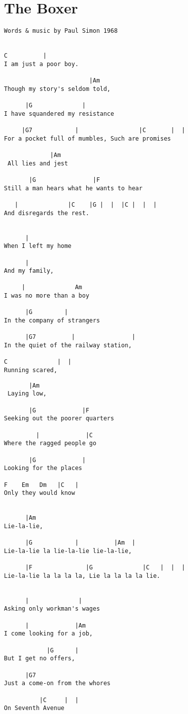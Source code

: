 \documentclass[leqno]{memoir}
\begin{document}
\chapter{The Boxer}
\begin{verbatim}
Words & music by Paul Simon 1968


C          |
I am just a poor boy.

                        |Am
Though my story's seldom told,

      |G              |
I have squandered my resistance

     |G7            |                 |C       |  |
For a pocket full of mumbles, Such are promises

             |Am
 All lies and jest

       |G                |F
Still a man hears what he wants to hear

   |              |C    |G |  |  |C |  |  |
And disregards the rest.


      | 
When I left my home

      |
And my family,

     |              Am
I was no more than a boy

      |G         |
In the company of strangers

      |G7          |                |
In the quiet of the railway station,

C              |  |
Running scared,
\end{verbatim}
\newpage
\begin{verbatim}
       |Am
 Laying low,

       |G             |F
Seeking out the poorer quarters

         |             |C
Where the ragged people go

       |G             |
Looking for the places

F    Em   Dm   |C   |
Only they would know


      |Am
Lie-la-lie, 

      |G            |          |Am  |
Lie-la-lie la lie-la-lie lie-la-lie, 

      |F               |G              |C   |  |  | 
Lie-la-lie la la la la, Lie la la la la lie.


      |              |
Asking only workman's wages

      |             |Am 
I come looking for a job,

            |G      |
But I get no offers,

      |G7
Just a come-on from the whores

          |C     |  |
On Seventh Avenue
\end{verbatim}
\end{document}
